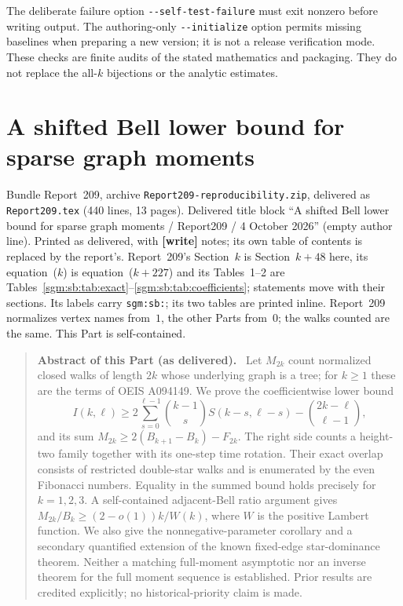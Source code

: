 \documentclass[11pt,letterpaper]{article}
\theoremstyle{remark}\newtheorem{remark}[theorem]{Remark}
\newcommand{\file}[1]{\nolinkurl{#1}}
\newenvironment{partabstract}{\begin{quote}\small\noindent\textbf{Abstract of this Part (as delivered).}\ }{\end{quote}}
\newcommand{\partsource}[1]{\par\noindent\begin{minipage}{\textwidth}\small #1\end{minipage}\par\medskip}
\theoremstyle{definition}\newtheorem{definition}[theorem]{Definition}
\begin{document}
The deliberate failure option \texttt{-{}-self-test-failure} must exit nonzero before writing output. The authoring-only \texttt{-{}-initialize} option permits missing baselines when preparing a new version; it is not a release verification mode. These checks are finite audits of the stated mathematics and packaging. They do not replace the all-$k$ bijections or the analytic estimates.

\part{A shifted Bell lower bound for sparse graph moments}\label{sgm:sb:part}
\setcounter{section}{48}
\partsource{Bundle Report~209, archive \file{Report209-reproducibility.zip}, delivered as \file{Report209.tex} (440 lines, 13 pages). Delivered title block ``A shifted Bell lower bound for sparse graph moments / Report209 / 4 October 2026'' (empty author line). Printed as delivered, with \textbf{[write]} notes; its own table of contents is replaced by the report's. Report~209's Section~$k$ is Section~$k+48$ here, its equation~($k$) is equation~($k+227$) and its Tables~1--2 are Tables~\ref{sgm:sb:tab:exact}--\ref{sgm:sb:tab:coefficients}; statements move with their sections. Its labels carry \file{sgm:sb:}; its two tables are printed inline. Report~209 normalizes vertex names from~$1$, the other Parts from~$0$; the walks counted are the same. This Part is self-contained.}
\begin{partabstract}
Let $M_{2k}$ count normalized closed walks of length $2k$ whose underlying graph is a tree; for $k\ge1$ these are the terms of OEIS A094149. We prove the coefficientwise lower bound
\[
 I(k,\ell)\ge 2\sum_{s=0}^{\ell-1}\binom{k-1}{s}S(k-s,\ell-s)
              -\binom{2k-\ell}{\ell-1},
\]
and its sum $M_{2k}\ge 2(B_{k+1}-B_k)-F_{2k}$. The right side counts a height-two family together with its one-step time rotation. Their exact overlap consists of restricted double-star walks and is enumerated by the even Fibonacci numbers. Equality in the summed bound holds precisely for $k=1,2,3$. A self-contained adjacent-Bell ratio argument gives $M_{2k}/B_k\ge(2-o(1))k/W(k)$, where $W$ is the positive Lambert function. We also give the nonnegative-parameter corollary and a secondary quantified extension of the known fixed-edge star-dominance theorem. Neither a matching full-moment asymptotic nor an inverse theorem for the full moment sequence is established. Prior results are credited explicitly; no historical-priority claim is made.
\end{partabstract}
\end{document}
